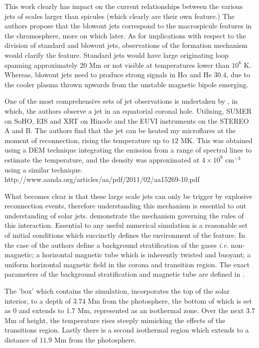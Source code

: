 This work clearly has impact on the current relationships between the various jets of scales larger than spicules (which clearly are their own feature.)
The authors propose that the blowout jets correspond to the macrospicule features in the chromosphere, more on which later.
As for implications with respect to the division of standard and blowout jets, observations of the formation mechanism would clarify the feature.
Standard jets would have large originating loop spanning approximately $20$ Mm or not visible at temperatures lower than  $10^6$ K.
Whereas, blowout jets need to produce strong signals in H$\alpha$ and He $30.4$, due to the cooler plasma thrown upwards from the unstable magnetic bipole emerging.

One of the most comprehensive sets of jet observations is undertaken by \cite{Majarska2011}, in which, the authors observe a jet in an equatorial coronal hole.
Utilising, SUMER on SoHO, EIS and XRT on Hinode and the EUVI instruments on the STEREO A and B.
The authors find that the jet can be heated my microflares at the moment of reconnection, rising the temperature up to $12$ MK.
This was obtained using a DEM technique integrating the emission from a range of spectral lines to estimate the temperature, and the density was approximated at $4 \times 10^9$ cm$^{-3}$ using a similar technique.
http://www.aanda.org/articles/aa/pdf/2011/02/aa15269-10.pdf

What becomes clear is that these large scale jets can only be trigger by explosive reconnection events, therefore understanding this mechanism is essential to out understanding of solar jets.
\cite{Archontis2005} demonstrate the mechanism governing the rules of this interaction.
Essential to any useful numerical simulation is a reasonable set of initial conditions which succinctly defines the environment of the feature.
In the case of the authors define a background stratification of the gases \emph{i.e.} non-magnetic; a horizontal magnetic tube which is inherently twisted and buoyant; a uniform horizontal magnetic field in the corona and transition region.
The exact parameters of the background stratification and magnetic tube are defined in \cite{Fan2001}.

The 'box' which contains the simulation, incorporates the top of the solar interior, to a depth of $3.74$ Mm from the photosphere, the bottom of which is set as 0 and extends to $1.7$ Mm, represented as an isothermal zone.
Over the next $3.7$ Mm of height, the temperature rises steeply mimicking the effects of the transitions region.
Lastly there is a second isothermal region which extends to a distance of $11.9$ Mm from the photosphere.


